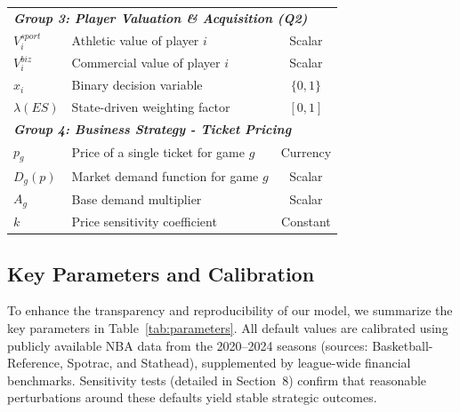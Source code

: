 \documentclass{mcmthesis}
\begin{document}
\begin{longtable}{@{}llc@{}}
\midrule
\multicolumn{3}{l}{\textit{\textbf{Group 3: Player Valuation \& Acquisition (Q2)}}} \\
$V^{sport}_i$ & Athletic value of player $i$ & Scalar \\
$V^{biz}_i$ & Commercial value of player $i$ & Scalar \\
$x_i$ & Binary decision variable & $\{0,1\}$ \\
$\lambda(ES)$ & State-driven weighting factor & $[0,1]$ \\

\midrule
\multicolumn{3}{l}{\textit{\textbf{Group 4: Business Strategy - Ticket Pricing}}} \\
$p_g$ & Price of a single ticket for game $g$ & Currency \\
$D_g(p)$ & Market demand function for game $g$ & Scalar \\
$A_g$ & Base demand multiplier & Scalar \\
$k$ & Price sensitivity coefficient & Constant \\

\end{longtable}


\subsection{Key Parameters and Calibration}
To enhance the transparency and reproducibility of our model, we summarize the key parameters in Table~\ref{tab:parameters}. All default values are calibrated using publicly available NBA data from the 2020--2024 seasons (sources: Basketball-Reference, Spotrac, and Stathead), supplemented by league-wide financial benchmarks. Sensitivity tests (detailed in Section~8) confirm that reasonable perturbations around these defaults yield stable strategic outcomes.
\end{document}
